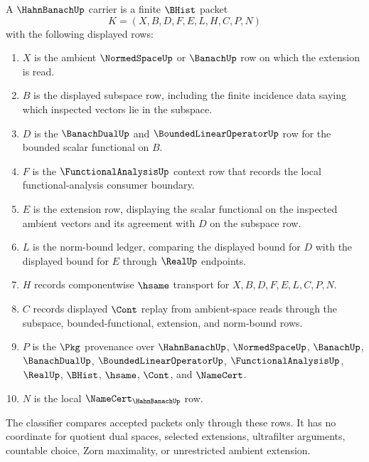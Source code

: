 \begin{definition}
\label{def:hahn-banach-carrier}
A $\HahnBanachUp$ carrier is a finite $\BHist$ packet
$$
K=(X,B,D,F,E,L,H,C,P,N)
$$
with the following displayed rows:
\begin{enumerate}
\item $X$ is the ambient $\NormedSpaceUp$ or $\BanachUp$ row on which the extension is read.
\item $B$ is the displayed subspace row, including the finite incidence data saying which inspected vectors lie in the subspace.
\item $D$ is the $\BanachDualUp$ and $\BoundedLinearOperatorUp$ row for the bounded scalar functional on $B$.
\item $F$ is the $\FunctionalAnalysisUp$ context row that records the local functional-analysis consumer boundary.
\item $E$ is the extension row, displaying the scalar functional on the inspected ambient vectors and its agreement with $D$ on the subspace row.
\item $L$ is the norm-bound ledger, comparing the displayed bound for $D$ with the displayed bound for $E$ through $\RealUp$ endpoints.
\item $H$ records componentwise $\hsame$ transport for $X,B,D,F,E,L,C,P,N$.
\item $C$ records displayed $\Cont$ replay from ambient-space reads through the subspace, bounded-functional, extension, and norm-bound rows.
\item $P$ is the $\Pkg$ provenance over $\HahnBanachUp$, $\NormedSpaceUp$, $\BanachUp$, $\BanachDualUp$, $\BoundedLinearOperatorUp$, $\FunctionalAnalysisUp$, $\RealUp$, $\BHist$, $\hsame$, $\Cont$, and $\NameCert$.
\item $N$ is the local $\NameCert_{\HahnBanachUp}$ row.
\end{enumerate}
The classifier compares accepted packets only through these rows. It has no coordinate for quotient dual spaces, selected extensions, ultrafilter arguments, countable choice, Zorn maximality, or unrestricted ambient extension.
\end{definition}

